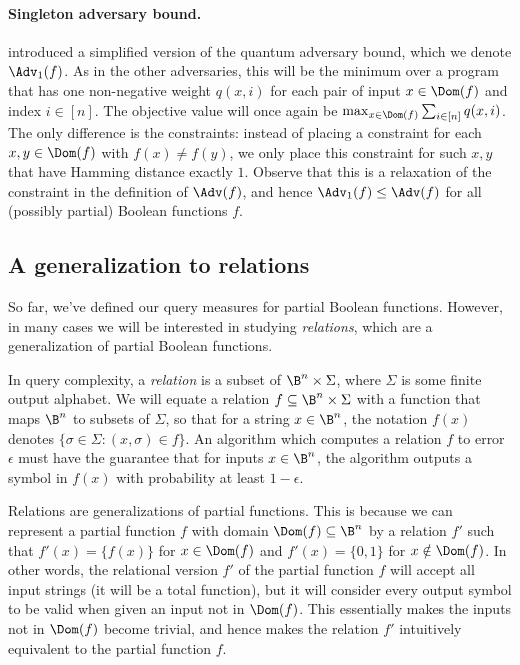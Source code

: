 \paragraph{Singleton adversary bound.}
\cite{ABK+20} introduced a simplified version
of the quantum adversary bound, which we denote
$\Adv_1(f)$. As in the other adversaries,
this will be the minimum over a program that has
one non-negative weight $q(x,i)$ for each pair
of input $x\in\Dom(f)$ and index $i\in[n]$.
The objective value will once again be
$\max_{x\in\Dom(f)}\sum_{i\in[n]} q(x,i)$.
The only difference is the constraints:
instead of placing a constraint
for each $x,y\in\Dom(f)$ with $f(x)\ne f(y)$,
we only place this constraint for such $x,y$
that have Hamming distance exactly $1$.
Observe that this is a relaxation
of the constraint in the definition of $\Adv(f)$,
and hence $\Adv_1(f)\le \Adv(f)$ for all (possibly partial)
Boolean functions $f$.

\subsection{A generalization to relations}

So far, we've defined our query measures for partial
Boolean functions. However, in many cases we will be interested
in studying \emph{relations}, which are a generalization
of partial Boolean functions.

In query complexity, a \emph{relation} is a subset
of $\B^n\times \Sigma$, where $\Sigma$ is some finite
output alphabet. We will equate a relation
$f\subseteq \B^n\times\Sigma$ with a function
that maps $\B^n$ to subsets of $\Sigma$, so that
for a string $x\in\B^n$, the notation $f(x)$ denotes
$\{\sigma\in\Sigma:(x,\sigma)\in f\}$.
An algorithm which computes a relation $f$ to error
$\epsilon$ must have the guarantee that for inputs $x\in\B^n$,
the algorithm outputs a symbol in $f(x)$ with probability
at least $1-\epsilon$.

Relations are generalizations of partial functions.
This is because we can represent a partial function
$f$ with domain $\Dom(f)\subseteq\B^n$ by a relation
$f'$ such that $f'(x)=\{f(x)\}$ for $x\in\Dom(f)$
and $f'(x)=\{0,1\}$ for $x\notin\Dom(f)$. In other words,
the relational version $f'$ of the partial function $f$
will accept all input strings (it will be a total function),
but it will consider every output symbol to be valid
when given an input not in $\Dom(f)$. This essentially
makes the inputs not in $\Dom(f)$ become trivial, and hence
makes the relation $f'$ intuitively equivalent to the partial
function $f$.

